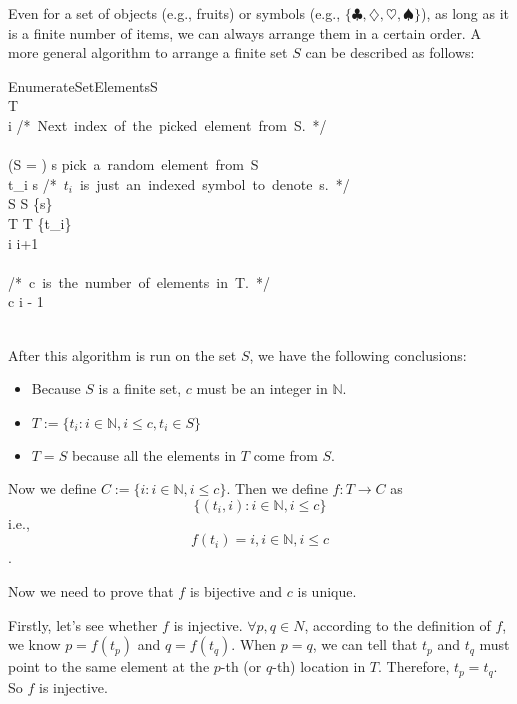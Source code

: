 \documentclass[12pt, letterpaper, oneside]{book}
\begin{document}
Even for a set of objects (e.g., fruits) or symbols (e.g., $\{\clubsuit,
  \diamondsuit, \heartsuit, \spadesuit \}$), as long as it is a finite number of
items, we can always arrange them in a certain order. A more general algorithm
to arrange a finite set $S$ can be described as follows:

\begin{pseudocode}[ruled]{EnumerateSetElements}{S}
   \\
  T \GETS \emptyset \\
  i  \mbox{/* Next index of the picked element from S. */} \\
  \\
  \WHILE \NOT (S = \emptyset) \DO
  \BEGIN
  s \GETS \mbox{pick a random element from S} \\
  t_i \GETS s \mbox{/* $t_i$ is just an indexed symbol to denote s. */} \\
  S \GETS S \setminus \{s\} \\
  T \GETS T \cup \{t_i\} \\
  i \GETS i+1
  \END \\
  \\
  \mbox{/* c is the number of elements in T. */} \\
  c \GETS i - 1 \\
  \\
\end{pseudocode}

After this algorithm is run on the set $S$, we have the following conclusions:
\begin{itemize}
  \item Because $S$ is a finite set, $c$ must be an integer in $\mathbb{N}$.
  \item $T:= \{t_i: i \in \mathbb{N}, i \leq c, t_i \in S \}$
  \item $T = S$ because all the elements in $T$ come from $S$.
\end{itemize}

Now we define $C := \{i: i \in \mathbb{N}, i \leq c\}$. Then we define
$f: T \rightarrow C$ as \[\{(t_i, i): i \in \mathbb{N}, i \leq c\}\] i.e., \[
  f(t_i) = i, i \in \mathbb{N}, i \leq c\].

Now we need to prove that $f$ is bijective and $c$ is unique.

Firstly, let's see whether $f$ is injective. $\forall p, q \in N$, according to
the definition of $f$, we know $p = f(t_p)$ and $q = f(t_q)$. When $p = q$, we
can tell that $t_p$ and $t_q$ must point to the same element at the $p$-th (or
$q$-th) location in $T$. Therefore, $t_p = t_q$. So $f$ is injective.
\end{document}
